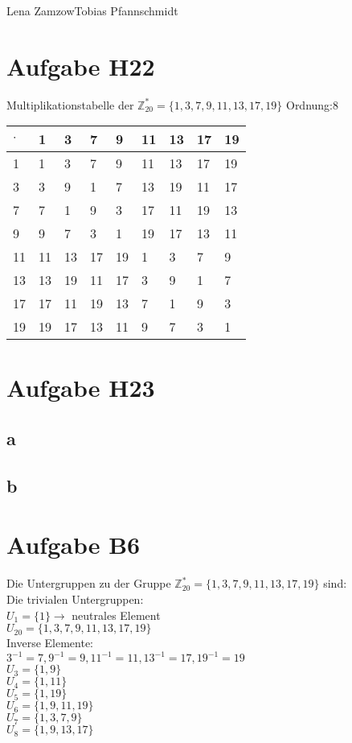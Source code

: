 \documentclass[11pt,a4paper]{article}
\begin{document}
                {Lena Zamzow}{Tobias Pfannschmidt}{}{}{}


\section*{Aufgabe H22}
Multiplikationstabelle der $\mathbb{Z}^{*}_{20} = \{1,3,7,9,11,13,17,19\}$ Ordnung:8\\
\begin{center}
	\begin{tabular}{ | l | l | l | l | l | l | l| l|l}
		\hline
		$\cdot$&1&3&7&9&11&13&17&19 \\ \hline \hline		
		1&1&3&7&9&11&13&17&19 \\ \hline 	
		3&3&9&1&7&13&19&11&17 \\ \hline
		7&7&1&9&3&17&11&19&13\\ \hline	
		9&9&7&3&1&19&17&13&11 \\ \hline
		11&11&13&17&19&1&3&7&9 \\ \hline
		13&13&19&11&17&3&9&1&7 \\ \hline
		17&17&11&19&13&7&1&9&3 \\ \hline
		19&19&17&13&11&9&7&3&1 \\ \hline 
	\end{tabular}
\end{center}
\section*{Aufgabe H23}
\subsection*{a}
\subsection*{b}
\section*{Aufgabe B6}
Die Untergruppen zu der Gruppe $\mathbb{Z}^{*}_{20} = \{1,3,7,9,11,13,17,19\}$ sind:\\
Die trivialen Untergruppen:\\
$U_1 =\{1\} \longrightarrow$ neutrales Element\\
$U_20 = \{1,3,7,9,11,13,17,19\}$\\
Inverse Elemente:\\
$3^{-1}=7, 9^{-1}=9, 11^{-1}=11, 13^{-1}=17, 19^{-1}=19$\\
$U_3=\{1,9\}$\\
$U_4=\{1,11\}$\\
$U_5=\{1,19\}$\\
$U_6=\{1,9,11,19\}$\\
$U_7=\{1,3,7,9\}$\\
$U_8=\{1,9,13,17\}$\\
\end{document}
